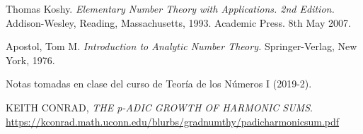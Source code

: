 \documentclass[11pt,letterpaper]{article}
\theoremstyle{definition}\newtheorem{p}{Ejercicio}
\theoremstyle{definition}\newtheorem{pp}[p]{$(*)$Ejercicio}
\numberwithin{p}{section}
\begin{document}


\begin{thebibliography}{}

\bibitem{} 
Thomas Koshy. 
\textit{Elementary Number Theory with Applications. 2nd Edition.}
Addison-Wesley, Reading, Massachusetts, 1993.
Academic Press. 
8th May 2007.

\bibitem{}
Apostol, Tom M. 
\textit{Introduction to Analytic Number Theory.} 
Springer-Verlag, New York, 1976.

\bibitem{}
Notas tomadas en clase del curso de Teoría de los Números I (2019-2).

\bibitem{}
KEITH CONRAD,
\textit{THE p-ADIC GROWTH OF HARMONIC SUMS}.\\
\url{https://kconrad.math.uconn.edu/blurbs/gradnumthy/padicharmonicsum.pdf}

\end{thebibliography}
\end{document}

